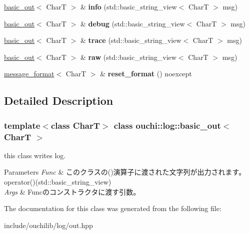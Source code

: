 \begin{DoxyCompactItemize}
\mbox{\label{classouchi_1_1log_1_1basic__out_a11b169da2c6f6b251e4b7f9ac7cbffe4}} 
\mbox{\hyperlink{classouchi_1_1log_1_1basic__out}{basic\+\_\+out}}$<$ CharT $>$ \& {\bfseries info} (std\+::basic\+\_\+string\+\_\+view$<$ CharT $>$ msg)
\item 
\mbox{\label{classouchi_1_1log_1_1basic__out_ae25b00212ae8a8b225001a70457d116a}} 
\mbox{\hyperlink{classouchi_1_1log_1_1basic__out}{basic\+\_\+out}}$<$ CharT $>$ \& {\bfseries debug} (std\+::basic\+\_\+string\+\_\+view$<$ CharT $>$ msg)
\item 
\mbox{\label{classouchi_1_1log_1_1basic__out_a212edd322483ef79bd724b165deafce5}} 
\mbox{\hyperlink{classouchi_1_1log_1_1basic__out}{basic\+\_\+out}}$<$ CharT $>$ \& {\bfseries trace} (std\+::basic\+\_\+string\+\_\+view$<$ CharT $>$ msg)
\item 
\mbox{\label{classouchi_1_1log_1_1basic__out_a7a575e8681b8a88179d6b73fd9ca697f}} 
\mbox{\hyperlink{classouchi_1_1log_1_1basic__out}{basic\+\_\+out}}$<$ CharT $>$ \& {\bfseries raw} (std\+::basic\+\_\+string\+\_\+view$<$ CharT $>$ msg)
\item 
\mbox{\label{classouchi_1_1log_1_1basic__out_a06a3892f67accc522d0e8379b89e207f}} 
\mbox{\hyperlink{classouchi_1_1log_1_1message__format}{message\+\_\+format}}$<$ CharT $>$ \& {\bfseries reset\+\_\+format} () noexcept
\end{DoxyCompactItemize}


\subsection{Detailed Description}
\subsubsection*{template$<$class CharT$>$\newline
class ouchi\+::log\+::basic\+\_\+out$<$ Char\+T $>$}

this class writes log. 


\begin{DoxyParams}{Parameters}
{\em Func} & このクラスの()演算子に渡された文字列が出力されます。operator()(std\+::basic\+\_\+string\+\_\+view)\\
\hline
{\em Args} & Funcのコンストラクタに渡す引数。\\
\hline
\end{DoxyParams}


The documentation for this class was generated from the following file\+:\begin{DoxyCompactItemize}
\item 
include/ouchilib/log/out.\+hpp\end{DoxyCompactItemize}
